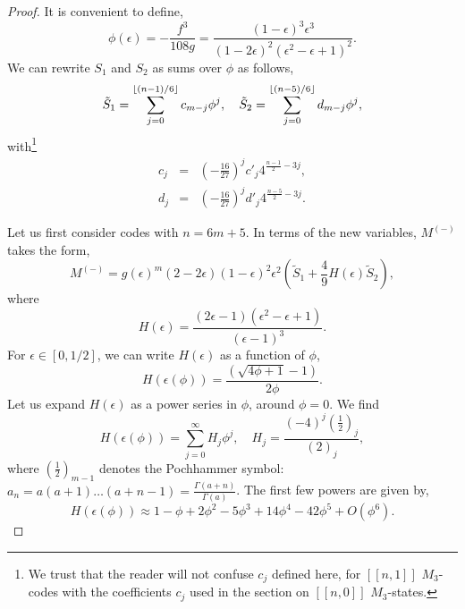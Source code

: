 \documentclass[11pt]{article}
\DeclarePairedDelimiter\floor{\lfloor}{\rfloor}
\begin{document}
\begin{proof}

It is convenient to define, \begin{equation}
    \phi(\epsilon)= -\frac{{ f}^3}{108  {g}}= \frac{(1-\epsilon )^3 \epsilon ^3}{(1-2 \epsilon )^2 \left(\epsilon ^2-\epsilon +1\right)^2}. \label{phi}
\end{equation}
We can rewrite $S_1$ and $S_2$ as sums over $\phi$
 as follows,
 \begin{equation}
    \tilde{S}_1=  \sum_{j=0}^{\floor{(n-1)/6}} c_{m-j} \phi^{j},  \quad \tilde{S}_2 = \sum_{j=0}^{\floor{(n-5)/6}}  d_{m-j} \phi^j, \label{sums}
\end{equation} with\footnote{We trust that the reader will not confuse $c_j$ defined here, for $[[n,1]]$ $M_3$-codes with the coefficients $c_j$ used in the section on $[[n,0]]$ $M_3$-states.}
\begin{eqnarray}
    c_j & = &  \left(-\frac{16}{27}\right)^j c'_j 4^{\frac{n-1}{2}-3 j}, \\
    d_j & = & \left(-\frac{16}{27}\right)^j d'_{j} 4^{\frac{n-5}{2}-3 j}.
\end{eqnarray}

Let us first consider codes with $n =6m+5$.  In terms of the new variables, $M^{(-)}$ takes the form,
\begin{equation}
    M^{(-)}= g(\epsilon)^m (2-2 \epsilon ) (1-\epsilon )^2 \epsilon ^2 \left(\tilde{S}_1+\frac{4}{9}H(\epsilon) \tilde{S}_2 \right),
\end{equation}
where 
\begin{equation}
H(\epsilon)=\frac{(2 \epsilon -1) \left(\epsilon ^2-\epsilon +1\right)}{(\epsilon -1)^3}. \label{H}
\end{equation}
For $\epsilon \in [0,1/2]$, we can write $H(\epsilon)$ as a function of $\phi$,
\begin{equation}
H(\epsilon(\phi))=\frac{\left(\sqrt{4 \phi +1}-1\right)}{2\phi }.
\end{equation}
Let us expand $H(\epsilon)$ as a power series in $\phi$, around $\phi=0$. We find
\begin{equation}
    H(\epsilon(\phi)) = \sum_{j=0}^\infty H_j \phi^j, \quad  H_j = \frac{(-4)^j \left(\frac{1}{2}\right)_j}{(2)_j}, \label{Hseries}
\end{equation}
where $\left(\frac{1}{2}\right)_{m-1}$ denotes the Pochhammer symbol: $a_n=a (a+1) \ldots  (a+n-1)=\frac{\Gamma  (a+n)}{\Gamma (a)}$.
The first few powers are given by,
\begin{equation}
     H(\epsilon(\phi)) \approx 1-\phi+2 \phi ^2 -5 \phi ^3 +14 \phi ^4 -42 \phi ^5 +O(\phi^6).
\end{equation}


\end{proof}
\end{document}
